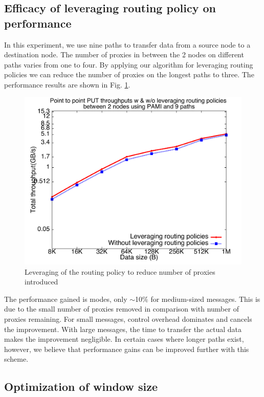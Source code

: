 \documentclass[final,5p,times]{elsarticle}
\begin{document}
\subsection{Efficacy of leveraging routing policy on performance}
In this experiment, we use nine paths to transfer data from a source node to a destination node. The number of proxies in between the 2 nodes on different paths varies from one to four. By applying our algorithm for leveraging routing policies we can reduce the number of proxies on the longest paths to three. The performance results are shown in Fig. \ref{fig:pami_shorterpaths}.

\begin{figure}[!htb]
\centering
\includegraphics[scale=0.3]{pami_shorterpaths.pdf}
\caption{Leveraging of the routing policy to reduce number of proxies introduced}
\label{fig:pami_shorterpaths}
\end{figure}

The performance gained is modes, only $\sim$10\% for medium-sized messages. This is due to the small number of proxies removed in comparison with number of proxies remaining. For small messages, control overhead dominates and cancels the improvement. With large messages, the time to transfer the actual data makes the improvement negligible. In certain cases where longer paths exist, however, we believe that performance gains can be improved further with this scheme. 


\subsection{Optimization of window size}
\end{document}
